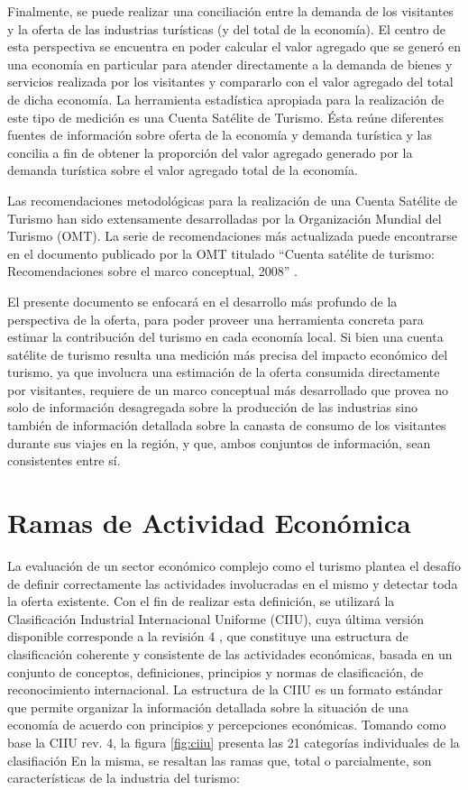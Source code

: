 \documentclass[
  openany]{book}
\begin{document}
Finalmente, se puede realizar una conciliación entre la demanda de los visitantes y la oferta de las industrias turísticas (y del total de la economía). El centro de esta perspectiva se encuentra en poder calcular el valor agregado que se generó en una economía en particular para atender directamente a la demanda de bienes y servicios realizada por los visitantes y compararlo con el valor agregado del total de dicha economía. La herramienta estadística apropiada para la realización de este tipo de medición es una Cuenta Satélite de Turismo. Ésta reúne diferentes fuentes de información sobre oferta de la economía y demanda turística y las concilia a fin de obtener la proporción del valor agregado generado por la demanda turística sobre el valor agregado total de la economía.

Las recomendaciones metodológicas para la realización de una Cuenta Satélite de Turismo han sido extensamente desarrolladas por la Organización Mundial del Turismo (OMT). La serie de recomendaciones más actualizada puede encontrarse en el documento publicado por la OMT titulado ``Cuenta satélite de turismo: Recomendaciones sobre el marco conceptual, 2008'' \citep{cstrmc2008}.

El presente documento se enfocará en el desarrollo más profundo de la perspectiva de la oferta, para poder proveer una herramienta concreta para estimar la contribución del turismo en cada economía local. Si bien una cuenta satélite de turismo resulta una medición más precisa del impacto económico del turismo, ya que involucra una estimación de la oferta consumida directamente por visitantes, requiere de un marco conceptual más desarrollado que provea no solo de información desagregada sobre la producción de las industrias sino también de información detallada sobre la canasta de consumo de los visitantes durante sus viajes en la región, y que, ambos conjuntos de información, sean consistentes entre sí.

\hypertarget{ramas-de-actividad-econuxf3mica}{%
\section{Ramas de Actividad Económica}\label{ramas-de-actividad-econuxf3mica}}

La evaluación de un sector económico complejo como el turismo plantea el desafío de definir correctamente las actividades involucradas en el mismo y detectar toda la oferta existente. Con el fin de realizar esta definición, se utilizará la Clasificación Industrial Internacional Uniforme (CIIU), cuya última versión disponible corresponde a la revisión 4 \citep{ciiurev4}, que constituye una estructura de clasificación coherente y consistente de las actividades económicas, basada en un conjunto de conceptos, definiciones, principios y normas de clasificación, de reconocimiento internacional. La estructura de la CIIU es un formato estándar que permite organizar la información detallada sobre la situación de una economía de acuerdo con principios y percepciones económicas. Tomando como base la CIIU rev. 4, la figura \ref{fig:ciiu} presenta las 21 categorías individuales de la clasifiación En la misma, se resaltan las ramas que, total o parcialmente, son características de la industria del turismo:
\end{document}
